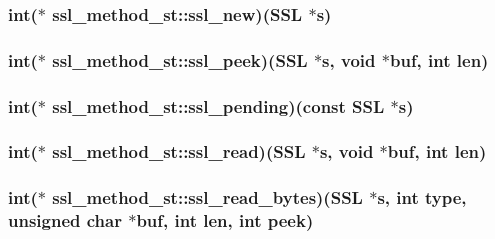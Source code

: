 \hypertarget{structssl__method__st_acaa00d8029276a73255202097f72d08e}{
\subsubsection[{ssl\-\_\-new}]{\setlength{\rightskip}{0pt plus 5cm}int($\ast$ ssl\-\_\-method\-\_\-st\-::ssl\-\_\-new)(S\-S\-L $\ast$s)}}\label{structssl__method__st_acaa00d8029276a73255202097f72d08e}
\hypertarget{structssl__method__st_a60436ba7ecb765f60d5bfd6abe50018a}{
\subsubsection[{ssl\-\_\-peek}]{\setlength{\rightskip}{0pt plus 5cm}int($\ast$ ssl\-\_\-method\-\_\-st\-::ssl\-\_\-peek)(S\-S\-L $\ast$s, void $\ast$buf, int len)}}\label{structssl__method__st_a60436ba7ecb765f60d5bfd6abe50018a}
\hypertarget{structssl__method__st_a94feb7703c74de9cdbe49d2b2772d97e}{
\subsubsection[{ssl\-\_\-pending}]{\setlength{\rightskip}{0pt plus 5cm}int($\ast$ ssl\-\_\-method\-\_\-st\-::ssl\-\_\-pending)(const S\-S\-L $\ast$s)}}\label{structssl__method__st_a94feb7703c74de9cdbe49d2b2772d97e}
\hypertarget{structssl__method__st_a741f8e13c3d0cd4efe02bd3ada49810b}{
\subsubsection[{ssl\-\_\-read}]{\setlength{\rightskip}{0pt plus 5cm}int($\ast$ ssl\-\_\-method\-\_\-st\-::ssl\-\_\-read)(S\-S\-L $\ast$s, void $\ast$buf, int len)}}\label{structssl__method__st_a741f8e13c3d0cd4efe02bd3ada49810b}
\hypertarget{structssl__method__st_a8dd5a534ea9770a3fcf2ea91ce8b30d1}{
\subsubsection[{ssl\-\_\-read\-\_\-bytes}]{\setlength{\rightskip}{0pt plus 5cm}int($\ast$ ssl\-\_\-method\-\_\-st\-::ssl\-\_\-read\-\_\-bytes)(S\-S\-L $\ast$s, int type, unsigned char $\ast$buf, int len, int peek)}}\label{structssl__method__st_a8dd5a534ea9770a3fcf2ea91ce8b30d1}
